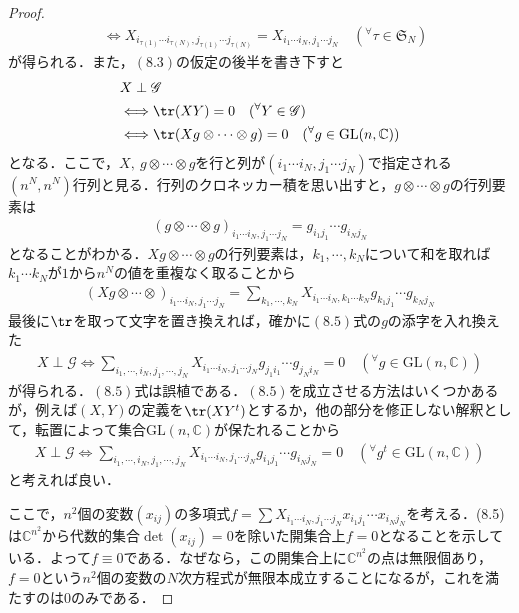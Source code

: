 \documentclass[dvipdfmx]{jsarticle}
\newtheorem{proof}{証明}
\begin{document}
\begin{proof}
\begin{align*}
&\Longleftrightarrow X_{i_{\tau(1)}\cdots i_{\tau(N)},j_{\tau(1)}\cdots j_{\tau(N)}}=X_{i_1\cdots i_N,j_1\cdots j_N} \quad ( ^\forall \tau\in\mathfrak{S}_N)
\end{align*}
が得られる．また，$(8.3)$の仮定の後半を書き下すと
\begin{align*}
&X\perp\mathscr{G} \\
&\Longleftrightarrow \tr(XY)=0 \quad ( ^\forall Y\in\mathscr{G}) \\
&\Longleftrightarrow \tr(Xg\otimes\cdots\otimes g)=0 \quad ( ^\forall g\in\mathrm{GL}(n,\mathbb{C}))
\end{align*}
となる．ここで，$X,{\ }g\otimes\cdots\otimes g$を行と列が$(i_1\cdots i_N,j_1\cdots j_N)$で指定される$(n^N,n^N)$行列と見る．行列のクロネッカー積を思い出すと，$g\otimes\cdots\otimes g$の行列要素は
\begin{align*}
(g\otimes\cdots\otimes g)_{i_1\cdots i_N,j_1\cdots j_N}=g_{i_1j_1}\cdots g_{i_Nj_N}
\end{align*}
となることがわかる．$Xg\otimes\cdots\otimes g$の行列要素は，$k_1,\cdots ,k_N$について和を取れば$k_1\cdots k_N$が$1$から$n^N$の値を重複なく取ることから
\begin{align*}
(Xg\otimes\cdots\otimes)_{i_1\cdots i_N,j_1\cdots j_N}=\sum_{k_1,\cdots ,k_N}X_{i_1\cdots i_N,k_1\cdots k_N}g_{k_1j_1}\cdots g_{k_Nj_N}
\end{align*}
最後に$\tr$を取って文字を置き換えれば，確かに$(8.5)$式の$g$の添字を入れ換えた
\begin{align*}
X\perp\mathscr{G}\Longleftrightarrow \sum_{i_1,\cdots,i_N,j_1,\cdots,j_N}X_{i_1\cdots i_N,j_1\cdots j_N}g_{j_1i_1}\cdots g_{j_Ni_N}=0 \quad ( ^\forall g\in\mathrm{GL}(n,\mathbb{C}))
\end{align*}
が得られる．$(8.5)$式は誤植である．$(8.5)$を成立させる方法はいくつかあるが，例えば$(X,Y)$の定義を$\tr(XY^t)$とするか，他の部分を修正しない解釈として，転置によって集合$\mathrm{GL}(n,\mathbb{C})$が保たれることから
\begin{align*}
X\perp\mathscr{G}\Longleftrightarrow \sum_{i_1,\cdots,i_N,j_1,\cdots,j_N}X_{i_1\cdots i_N,j_1\cdots j_N}g_{i_1j_1}\cdots g_{i_Nj_N}=0 \quad ( ^\forall g^t\in\mathrm{GL}(n,\mathbb{C}))
\end{align*}
と考えれば良い．
\par
ここで，$n^2$個の変数$(x_{ij})$の多項式$f=\sum X_{i_1\cdots i_N,j_1\cdots j_N}x_{i_1j_1}\cdots x_{i_Nj_N}$を考える．(8.5)は$\mathbb{C}^{n^2}$から代数的集合$\det(x_{ij})=0$を除いた開集合上$f=0$となることを示している．よって$f\equiv 0$である．なぜなら，この開集合上に$\mathbb{C}^{n^2}$の点は無限個あり，$f=0$という$n^2$個の変数の$N$次方程式が無限本成立することになるが，これを満たすのは$0$のみである．\par

\end{proof}
\end{document}
